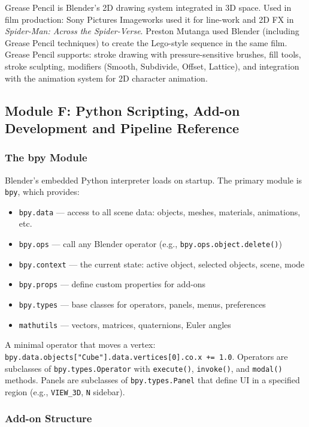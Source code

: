 \documentclass[11pt,letterpaper]{article}
\begin{document}
Grease Pencil is Blender's 2D drawing system integrated in 3D space. Used in film production: Sony Pictures Imageworks used it for line-work and 2D FX in \textit{Spider-Man: Across the Spider-Verse}. Preston Mutanga used Blender (including Grease Pencil techniques) to create the Lego-style sequence in the same film. Grease Pencil supports: stroke drawing with pressure-sensitive brushes, fill tools, stroke sculpting, modifiers (Smooth, Subdivide, Offset, Lattice), and integration with the animation system for 2D character animation.

\subsection{Module F: Python Scripting, Add-on Development and Pipeline Reference}

\subsubsection{The bpy Module}

Blender's embedded Python interpreter loads on startup. The primary module is \texttt{bpy}, which provides:
\begin{itemize}[leftmargin=2em]
  \item \texttt{bpy.data} --- access to all scene data: objects, meshes, materials, animations, etc.
  \item \texttt{bpy.ops} --- call any Blender operator (e.g., \texttt{bpy.ops.object.delete()})
  \item \texttt{bpy.context} --- the current state: active object, selected objects, scene, mode
  \item \texttt{bpy.props} --- define custom properties for add-ons
  \item \texttt{bpy.types} --- base classes for operators, panels, menus, preferences
  \item \texttt{mathutils} --- vectors, matrices, quaternions, Euler angles
\end{itemize}

A minimal operator that moves a vertex: \texttt{bpy.data.objects["Cube"].data.vertices[0].co.x += 1.0}. Operators are subclasses of \texttt{bpy.types.Operator} with \texttt{execute()}, \texttt{invoke()}, and \texttt{modal()} methods. Panels are subclasses of \texttt{bpy.types.Panel} that define UI in a specified region (e.g., \texttt{VIEW\_3D}, \texttt{N} sidebar).

\subsubsection{Add-on Structure}
\end{document}
